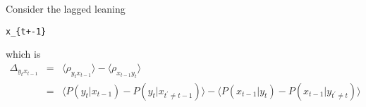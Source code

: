 \documentclass[a4paper,11pt]{article}
\begin{document}
Consider the lagged leaning
\begin{verbatim}
x_{t+-1}
\end{verbatim}
which is 
\begin{eqnarray}
\Delta_{y_t x_{t-1}} &=& \langle \rho_{y_t x_{t-1}}\rangle - \langle \rho_{x_{t-1} y_t}\rangle\\
&=& \langle P(y_t| x_{t-1}) - P(y_t| x_{t^\prime\neq t-1})\rangle - \langle P(x_{t-1} |y_t)-P(x_{t-1} |y_{t^\prime\neq t})\rangle
\end{eqnarray}

\newpage
$$
$$

\end{document}
